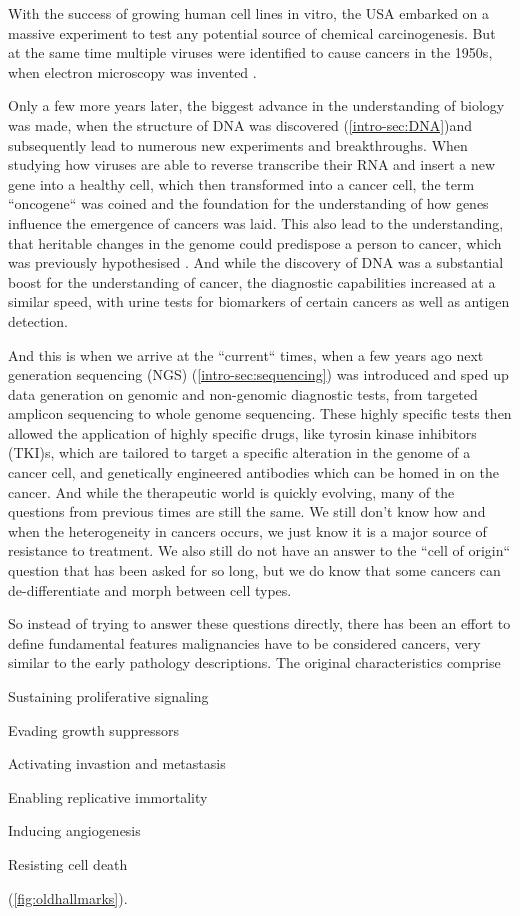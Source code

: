 With the success of growing human cell lines in vitro, the USA embarked on a massive experiment to test any potential source of chemical carcinogenesis. But at the same time multiple viruses were identified to cause cancers in the 1950s, when electron microscopy was invented \cite{Claude1947}.

Only a few more years later, the biggest advance in the understanding of biology was made, when the structure of DNA was discovered \cite{Watson1953} (\autoref{intro-sec:DNA})and subsequently lead to numerous new experiments and breakthroughs. When studying how viruses are able to reverse transcribe their RNA and insert a new gene into a healthy cell, which then transformed into a cancer cell, the term ``oncogene`` was coined\cite{Huebner1969,Baltimore1970,Temin1970} and the foundation for the understanding of how genes influence the emergence of cancers was laid. This also lead to the understanding, that heritable changes in the genome could predispose a person to cancer, which was previously hypothesised \cite{Li1969}. And while the discovery of DNA was a substantial boost for the understanding of cancer, the diagnostic capabilities increased at a similar speed, with urine tests for biomarkers of certain cancers as well as antigen detection.

And this is when we arrive at the ``current`` times, when a few years ago next generation sequencing (NGS) (\autoref{intro-sec:sequencing}) was introduced and sped up data generation on genomic and non-genomic diagnostic tests, from targeted amplicon sequencing to whole genome sequencing. These highly specific tests then allowed the application of highly specific drugs, like tyrosin kinase inhibitors (TKI)s, which are tailored to target a specific alteration in the genome of a cancer cell, and genetically engineered antibodies which can be homed in on the cancer. And while the therapeutic world is quickly evolving, many of the questions from previous times are still the same. We still don't know how and when the heterogeneity in cancers occurs, we just know it is a major source of resistance to treatment. We also still do not have an answer to the ``cell of origin`` question that has been asked for so long, but we do know that some cancers can de-differentiate and morph between cell types.

So instead of trying to answer these questions directly, there has been an effort to define fundamental features malignancies have to be considered cancers, very similar to the early pathology descriptions.  The original characteristics comprise 
\begin{enumerate*}
	\item Sustaining proliferative signaling
	\item Evading growth suppressors
	\item Activating invastion and metastasis
	\item Enabling replicative immortality
	\item Inducing angiogenesis
	\item Resisting cell death
\end{enumerate*} (\autoref{fig:oldhallmarks}). 


